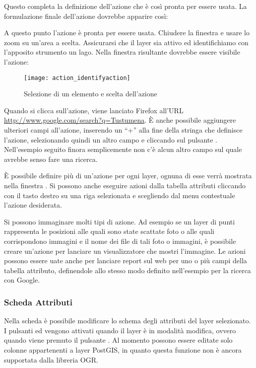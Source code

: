 Questo completa la definizione dell'azione che è così pronta per essere usata.
La formulazione finale dell'azione dovrebbe apparire così:

\begin{center}
\end{center}

A questo punto l'azione è pronta per essere usata. Chiudere la finestra
 e usare lo zoom su un'area a scelta. Assicurarsi
che il layer  sia attivo ed identifichiamo con l'apposito
strumento un lago. Nella finestra risultante dovrebbe essere visibile l'azione:

\begin{figure}[H]
   \begin{center}
   \caption{Selezione di un elemento e scelta dell'azione \nixcaption}\label{fig:identify_action}\smallskip
   \texttt{[image: action\_identifyaction]} 
\end{center}  
\end{figure}

Quando si clicca sull'azione, viene lanciato Firefox all'URL
\url{http://www.google.com/search?q=Tustumena}. È anche possibile aggiungere
ulteriori campi all'azione, inserendo un ``+'' alla fine della stringa che
definisce l'azione, selezionando quindi un altro campo e cliccando sul
pulsante . Nell'esempio seguito finora semplicemente non c'è alcun
altro campo sul quale avrebbe senso fare una ricerca.

È possibile definire più di un'azione per ogni layer, ognuna di esse verrà
mostrata nella finestra . Si possono anche
eseguire azioni dalla tabella attributi cliccando con il tasto destro su una
riga selezionata e scegliendo dal menu contestuale l'azione desiderata.

Si possono immaginare molti tipi di azione. Ad esempio se un layer di punti
rappresenta le posizioni alle quali sono state scattate foto o alle quali
corrispondono immagini e il nome dei file di tali foto o immagini, è possibile
creare un'azione per lanciare un visualizzatore che mostri l'immagine. Le
azioni possono essere uate anche per lanciare report sul web per uno o più
campi della tabella attributo, definendole allo stesso modo definito
nell'esempio per la ricerca con Google.

\subsubsection{Scheda Attributi}\label{label_attributes}
Nella scheda  è possibile modificare lo schema degli
attributi del layer selezionato. I pulsanti  ed
 vengono attivati quando il layer è in modalità
modifica, ovvero quando viene premuto il pulsante  . Al momento possono essere editate solo colonne appartenenti a layer
PostGIS, in quanto questa funzione non è ancora supportata dalla libreria OGR. 

